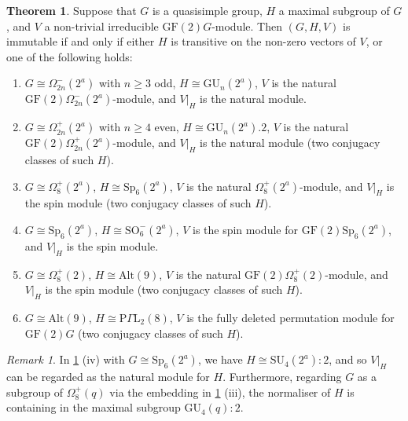 \documentclass[12pt]{amsart}
\theoremstyle{remark}
\newtheorem{remark}[theorem]{Remark}
\theoremstyle{notation}
\theoremstyle{definition}
\newtheorem{theoremA}{Theorem}
\newcommand{\SU}{\mathrm{SU}}
\newcommand{\GF}{\mathrm{GF}}
\newcommand{\Sp}{\mathrm{Sp}}
\newcommand{\GU}{\mathrm{GU}}
\newcommand{\0}{\emptyset}
\newcommand{\SO}{\mathrm{SO}}
\newcommand{\Alt}{\mathrm{Alt}}
\begin{document}
\begin{theoremA}\label{Main theorem}
Suppose that $ G $ is a quasisimple group, $ H $ a maximal subgroup of $ G $, and $ V $ a non-trivial irreducible $ \GF(2)G $-module.
Then $ (G,H,V) $ is immutable if and only if either $ H $ is transitive on the non-zero vectors of $ V$, or one of the following holds:
\begin{enumerate}
  \item $ G \cong \Omega_{2n}^-(2^a) $ with $ n \ge 3 $ odd,
  $ H \cong \GU_{n}(2^a) $,
  $ V $ is the natural $ \GF(2)\Omega_{2n}^-(2^a) $-module, and $ V|_H $ is the natural module.

  \item $ G \cong \Omega_{2n}^+(2^a) $ with $ n \ge 4 $ even,
  $ H \cong \GU_{n}(2^a).2 $,
  $ V $ is the natural $ \GF(2)\Omega_{2n}^+(2^a) $-module, and $ V|_H $ is the natural module
  (two conjugacy classes of such $ H $).

  \item $ G \cong \Omega_8^+(2^a) $,
  $ H \cong \Sp_6(2^a) $,
  $ V $ is the natural $ \Omega_8^+(2^a) $-module, and $ V|_H $ is the spin module
  (two conjugacy classes of such $ H $).

  \item $ G \cong \Sp_{6}(2^a) $,
  $ H \cong \SO_6^-(2^a) $,
  $ V $ is the spin module for $\GF(2) \Sp_{6}(2^a) $, and $ V|_H $ is the spin module.

  \item $ G \cong \Omega_8^+(2) $,
  $ H \cong \Alt(9) $,
  $ V $ is the natural $ \GF(2)\Omega_8^+(2) $-module, and $ V|_H $ is the spin module
  (two conjugacy classes of such $ H $).

  \item $ G \cong \Alt(9) $,
  $ H \cong \mathrm{P}\Gamma\mathrm{L}_2(8) $,
  $ V $ is the fully deleted permutation module for $ \GF(2)G $
  (two conjugacy classes of such $ H $).
\end{enumerate}
\end{theoremA}



\begin{remark}
In \cref{Main theorem} (iv) with $G \cong \Sp_6(2^a)$, we have   $H \cong  \SU_4(2^a){:}2$, and so $V|_H$ can be regarded as the natural module for $H$. Furthermore, regarding $G$ as a subgroup of $\Omega_8^+(q)$ via the embedding in \cref{Main theorem} (iii),   the normaliser of $H$ is containing in the maximal subgroup $\GU_4(q){:2}$.
\end{remark}
\end{document}
